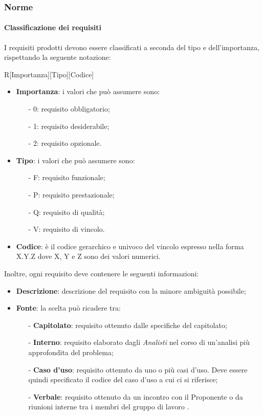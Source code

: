 \subsubsection{Norme}
\paragraph{Classificazione dei requisiti}
I requisiti prodotti devono essere classificati a seconda del tipo e dell'importanza, rispettando la seguente notazione:
\begin{center}
	R[Importanza][Tipo][Codice]
\end{center}

\begin{itemize}
	\item\textbf{Importanza}: i valori che può assumere sono:
	
	\begin{itemize}
		\item[-] 0: requisito obbligatorio;
		\item[-] 1: requisito desiderabile;
		\item[-] 2: requisito opzionale.
	\end{itemize}
	
	\item\textbf{Tipo}: i valori che può assumere sono:
		\begin{itemize}
			\item[-] F: requisito funzionale;
			\item[-] P: requisito prestazionale;
			\item[-] Q: requisito di qualità;
			\item[-] V: requisito di vincolo.
		\end{itemize}
	
	\item\textbf{Codice}: è il codice gerarchico e univoco del vincolo espresso nella forma X.Y.Z dove X, Y e Z sono dei valori numerici.
\end{itemize}
Inoltre, ogni requisito deve contenere le seguenti informazioni:
	
\begin{itemize}
	\item\textbf{Descrizione}: descrizione del requisito con la minore ambiguità possibile;
	\item\textbf{Fonte}: la scelta può ricadere tra:
	\begin{itemize}
		\item[-] \textbf{Capitolato}: requisito ottenuto dalle specifiche del capitolato;
		\item[-] \textbf{Interno}: requisito elaborato dagli \textit{Analisti} nel corso di un'analisi più approfondita del problema;
		\item[-] \textbf{Caso d'uso}: requisito ottenuto da uno o più casi d'uso. Deve essere quindi specificato il codice del caso d'uso a cui ci si riferisce;
		\item[-] \textbf{Verbale}: requisito ottenuto da un incontro con il Proponente o da riunioni interne tra i membri del gruppo di lavoro \GRUPPO.
	\end{itemize}
\end{itemize}

